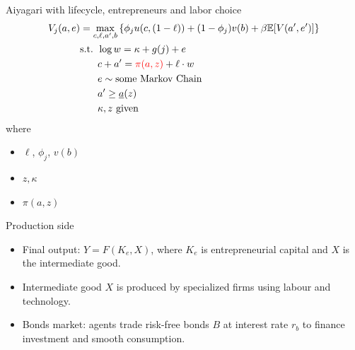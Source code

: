 \documentclass[aspectratio=169,mathserif]{beamer}
\begin{document}
\begin{frame}{Aiyagari with lifecycle, entrepreneurs and labor choice}
    \begin{align*}
    V_j(a, e) &= \max_{c, \ell, a', b} \left\{\phi_j u(c, (1-\ell)) + (1-\phi_j)v(b) + \beta \mathbb{E}[V(a', e')] \right\} \\
    &\begin{aligned} \text{s.t. } 
        & \log w = \kappa + g(j) + e \\
        & c + a' = \textcolor{red}{\pi(a, z)} + \ell \cdot w \\
        & e \sim \text{some Markov Chain} \\
        &a' \geq \underline{a}(z) \\
        &\kappa, z \text{ given}
    \end{aligned}
    \end{align*}
    where
    \begin{itemize}
        \item $\ell$, $\phi_j$, $v(b)$
        \item $z, \kappa$
        \item $\pi(a, z)$
    \end{itemize}
\end{frame}

\begin{frame}{Production side}
    \begin{itemize}
        \item Final output: $Y = F(K_e, X)$, where $K_e$ is entrepreneurial capital and $X$ is the intermediate good.
        \item Intermediate good $X$ is produced by specialized firms using labour and technology.
        \item Bonds market: agents trade risk-free bonds $B$ at interest rate $r_b$ to finance investment and smooth consumption.
    \end{itemize}
\end{frame}


\end{document}
